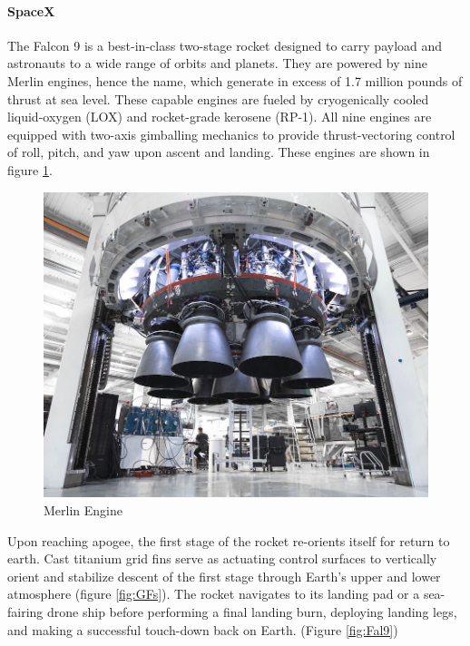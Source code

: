 \paragraph{SpaceX}
The Falcon 9 is a best-in-class two-stage rocket designed to carry payload and astronauts to a wide range of orbits and planets. They are powered by nine Merlin engines, hence the name, which generate in excess of 1.7 million pounds of thrust at sea level. These capable engines are fueled by cryogenically cooled liquid-oxygen (LOX) and rocket-grade kerosene (RP-1). All nine engines are equipped with two-axis gimballing mechanics to provide thrust-vectoring control of roll, pitch, and yaw upon ascent and landing. These engines are shown in figure \ref{fig:MEngine}.

\begin{figure}[H]
    \centering
    \includegraphics[scale=0.35]{src/figs/MerlinEngine.jpg}
    \caption{Merlin Engine}
    \label{fig:MEngine}
\end{figure}

Upon reaching apogee, the first stage of the rocket re-orients itself for return to earth. Cast titanium grid fins serve as actuating control surfaces to vertically orient and stabilize descent of the first stage through Earth's upper and lower atmosphere (figure \ref{fig:GFs}). The rocket navigates to its landing pad or a sea-fairing drone ship before performing a final landing burn, deploying landing legs, and making a successful touch-down back on Earth. (Figure \ref{fig:Fal9})

